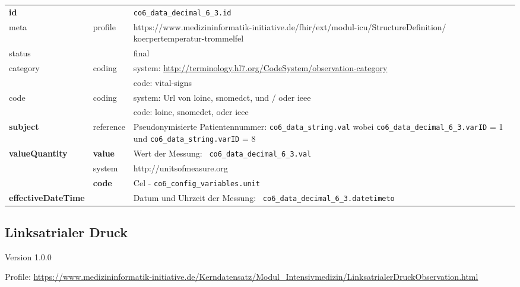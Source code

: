 \begin{longtable}{|l|l|p{7.5cm}|}
	\hline
	\rowcolor{lightgray} \multicolumn{3}{|l|}{Data Mapping (inhaltlich)} \\ \hline
	\textbf{id} &  & \texttt{co6\_data\_decimal\_6\_3.id} \\ \hline
	meta & profile & https://www.medizininformatik-initiative.de/fhir/ext/modul-icu/StructureDefinition/ koerpertemperatur-trommelfel \\ \hline 
	status &  & final   \\ \hline 
	category & coding & system: \url{http://terminology.hl7.org/CodeSystem/observation-category} \\
	\cline{3-3}
	& & code: vital-signs \\ \hline
	code & coding & system: Url von \ac{loinc}, \ac{snomedct}, und / oder \ac{ieee} \\ 
	\cline{3-3} 
	&  & code: \ac{loinc}, \ac{snomedct}, oder \ac{ieee} \\ \hline
	\textbf{subject} & reference & Pseudonymisierte Patientennummer: \texttt{co6\_data\_string.val} wobei \texttt{co6\_data\_decimal\_6\_3.varID} = 1 und \texttt{co6\_data\_string.varID} = 8 \\ \hline
	\textbf{valueQuantity}  & \textbf{value} & Wert der Messung: \texttt{
		co6\_data\_decimal\_6\_3.val} \\
	\cline{2-3}
	& system & http://unitsofmeasure.org \\
	\cline{2-3}
	& \textbf{code} & Cel - \texttt{co6\_config\_variables.unit} \\ \hline
	\textbf{effectiveDateTime}  & & Datum und Uhrzeit der Messung: \texttt{
		co6\_data\_decimal\_6\_3.datetimeto} \\ \hline
\end{longtable}

\subsection{Linksatrialer Druck} 
\noindent Version 1.0.0

\noindent Profile: \url{https://www.medizininformatik-initiative.de/Kerndatensatz/Modul_Intensivmedizin/LinksatrialerDruckObservation.html}

